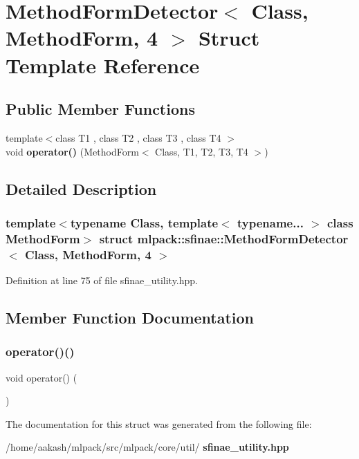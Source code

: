 \section{Method\+Form\+Detector$<$ Class, Method\+Form, 4 $>$ Struct Template Reference}
\label{structmlpack_1_1sfinae_1_1MethodFormDetector_3_01Class_00_01MethodForm_00_014_01_4}
\subsection*{Public Member Functions}
\begin{DoxyCompactItemize}
\item 
{\footnotesize template$<$class T1 , class T2 , class T3 , class T4 $>$ }\\void \textbf{ operator()} (Method\+Form$<$ Class, T1, T2, T3, T4 $>$)
\end{DoxyCompactItemize}


\subsection{Detailed Description}
\subsubsection*{template$<$typename Class, template$<$ typename... $>$ class Method\+Form$>$\newline
struct mlpack\+::sfinae\+::\+Method\+Form\+Detector$<$ Class, Method\+Form, 4 $>$}



Definition at line 75 of file sfinae\+\_\+utility.\+hpp.



\subsection{Member Function Documentation}
\mbox{\label{structmlpack_1_1sfinae_1_1MethodFormDetector_3_01Class_00_01MethodForm_00_014_01_4_aaa854ff97b6456aded243cc83db1ecdb}} 
\subsubsection{operator()()}
{\footnotesize\ttfamily void operator() (\begin{DoxyParamCaption}\item[{Method\+Form$<$ Class, T1, T2, T3, T4 $>$}]{ }\end{DoxyParamCaption})}



The documentation for this struct was generated from the following file\+:\begin{DoxyCompactItemize}
\item 
/home/aakash/mlpack/src/mlpack/core/util/\textbf{ sfinae\+\_\+utility.\+hpp}\end{DoxyCompactItemize}
